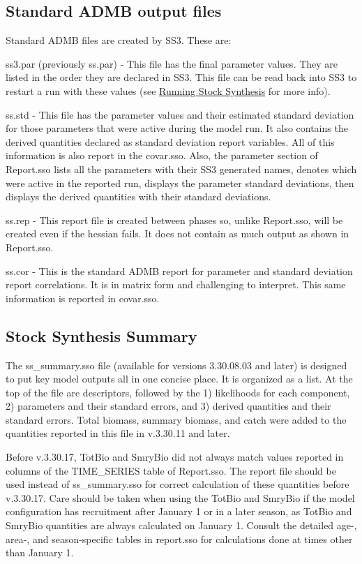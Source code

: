 \subsection{Standard ADMB output files}
Standard ADMB files are created by SS3. These are:

ss3.par (previously ss.par) - This file has the final parameter values. They are listed in the order they are declared in SS3. This file can be read back into SS3 to restart a run with these values (see \hyperref[sec:RunningSS3]{Running Stock Synthesis} for more info).

ss.std - This file has the parameter values and their estimated standard deviation for those parameters that were active during the model run. It also contains the derived quantities declared as standard deviation report variables. All of this information is also report in the covar.sso. Also, the parameter section of Report.sso lists all the parameters with their SS3 generated names, denotes which were active in the reported run, displays the parameter standard deviations, then displays the derived quantities with their standard deviations.

ss.rep - This report file is created between phases so, unlike Report.sso, will be created even if the hessian fails. It does not contain as much output as shown in Report.sso.

ss.cor - This is the standard ADMB report for parameter and standard deviation report correlations. It is in matrix form and challenging to interpret. This same information is reported in covar.sso.

\subsection{Stock Synthesis Summary}
The ss\_summary.sso file (available for versions 3.30.08.03 and later) is designed to put key model outputs all in one concise place. It is organized as a list. At the top of the file are descriptors, followed by the 1) likelihoods for each component, 2) parameters and their standard errors, and 3) derived quantities and their standard errors. Total biomass, summary biomass, and catch were added to the quantities reported in this file in v.3.30.11 and later.

Before v.3.30.17, TotBio and SmryBio did not always match values reported in columns of the TIME\_SERIES table of Report.sso. The report file should be used instead of ss\_summary.sso for correct calculation of these quantities before v.3.30.17. Care should be taken when using the TotBio and SmryBio if the model configuration has recruitment after January 1 or in a later season, as TotBio and SmryBio quantities are always calculated on January 1. Consult the detailed age-, area-, and season-specific tables in report.sso for calculations done at times other than January 1.

